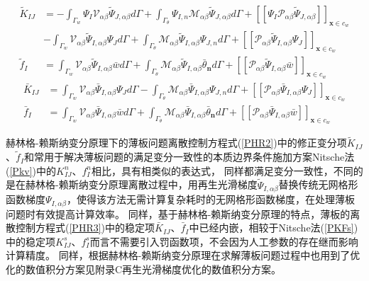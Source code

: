 \begin{subequations}\label{PHR2}
\begin{align}
    \label{PHR21} \tilde{K}_{IJ}&=-\int_{\Gamma_w}\Psi_I\mathcal{V}_{\alpha\beta}\tilde{\Psi}_{J,\alpha\beta}d\Gamma+\int_{\Gamma_{\theta}}\Psi_{I,n}\mathcal{M}_{\alpha\beta}\tilde{\Psi}_{J,\alpha\beta}d\Gamma+[[\Psi_I\mathcal{P}_{\alpha\beta}\tilde{\Psi}_{J,\alpha\beta}]]_{\pmb{x}\in{c_w}}\nonumber\\
    &-\int_{\Gamma_w}\mathcal{V}_{\alpha\beta}\tilde{\Psi}_{I,\alpha\beta}\Psi_Jd\Gamma+\int_{\Gamma_{\theta}}\mathcal{M}_{\alpha\beta}\tilde{\Psi}_{I,\alpha\beta}\Psi_{J,n}d\Gamma+[[\mathcal{P}_{\alpha\beta}\tilde{\Psi}_{I,\alpha\beta}\Psi_J]]_{\pmb{x}\in{c_w}} \\
    \label{PHR22}   \tilde{f}_I&=\int_{\Gamma_w}\mathcal{V}_{\alpha\beta}\tilde{\Psi}_{I,\alpha\beta}\bar{w}d\Gamma+\int_{\Gamma_{\theta}}\mathcal{M}_{\alpha\beta}\tilde{\Psi}_{I,\alpha\beta}\bar{\theta}_{\pmb n}d\Gamma+[[\mathcal{P}_{\alpha\beta}\tilde{\Psi}_{I,\alpha\beta}\bar{w}]]_{\pmb{x}\in{c_w}}
\end{align}
\end{subequations}
\begin{subequations}\label{PHR3}
\begin{align}
    \label{PHR31}   \bar{K}_{IJ}&=\int_{\Gamma_w}\mathcal{V}_{\alpha\beta}\bar{\Psi}_{I,\alpha\beta}\Psi_Jd\Gamma-\int_{\Gamma_{\theta}}\mathcal{M}_{\alpha\beta}\bar{\Psi}_{I,\alpha\beta}\Psi_{J,n}d\Gamma+[[\mathcal{P}_{\alpha\beta}\bar{\Psi}_{I,\alpha\beta}\Psi_J]]_{\pmb{x}\in{c_w}}\\
    \label{PHR32}  \bar{f}_I&=\int_{\Gamma_w}\mathcal{V}_{\alpha\beta}\bar{\Psi}_{I,\alpha\beta}\bar{w}d\Gamma+\int_{\Gamma_{\theta}}\mathcal{M}_{\alpha\beta}\bar{\Psi}_{I,\alpha\beta}\bar{\theta}_{\pmb n}d\Gamma+[[\mathcal{P}_{\alpha\beta}\bar{\Psi}_{I,\alpha\beta}\bar{w}]]_{\pmb{x}\in{c_w}}
\end{align}
\end{subequations}
\par
赫林格-赖斯纳变分原理下的薄板问题离散控制方程式(\ref{PHR2})中的修正变分项$\tilde{K}_{IJ}$、$\tilde{f}_I$和常用于解决薄板问题的满足变分一致性的本质边界条件施加方案Nitsche法(\ref{Pkv})中的$K_{IJ}^n$、$f_I^n$相比，具有相类似的表达式，
同样都满足变分一致性，不同的是在赫林格-赖斯纳变分原理离散过程中，用再生光滑梯度$\tilde{\Psi}_{I,\alpha\beta}$替换传统无网格形函数梯度$\Psi_{I,\alpha\beta}$，使得该方法无需计算复杂耗时的无网格形函数梯度，在处理薄板问题时有效提高计算效率。
同样，基于赫林格-赖斯纳变分原理的特点，薄板的离散控制方程式(\ref{PHR3})中的稳定项$\bar{K}_{IJ}$、$\bar{f}_I$中已经内嵌，相较于Nitsche法(\ref{PKFs})中的稳定项$K^s_{IJ}$、$f^s_I$而言不需要引入罚函数项，不会因为人工参数的存在继而影响计算精度。
同样，根据赫林格-赖斯纳变分原理在求解薄板问题过程中也用到了优化的数值积分方案见附录C再生光滑梯度优化的数值积分方案。
